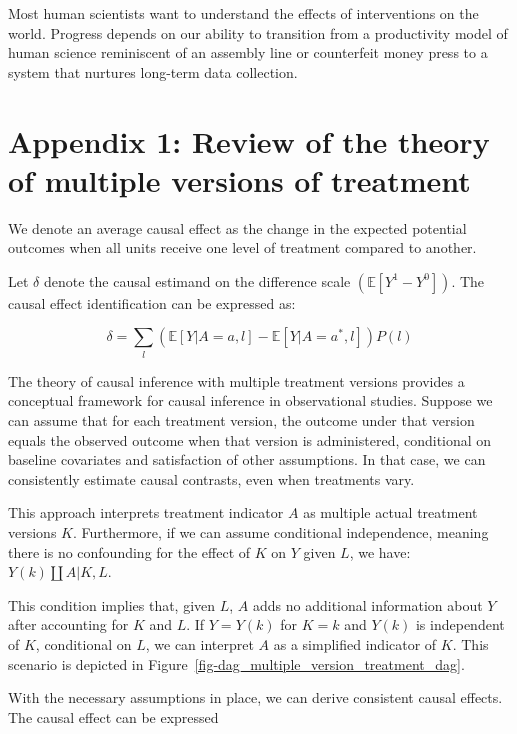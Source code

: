 \documentclass[
  singlecolumn]{report}
\begin{document}
Most human scientists want to understand the effects of interventions on
the world. Progress depends on our ability to transition from a
productivity model of human science reminiscent of an assembly line or
counterfeit money press to a system that nurtures long-term data
collection.

\newpage{}

\hypertarget{appendix-1-review-of-the-theory-of-multiple-versions-of-treatment}{%
\section{Appendix 1: Review of the theory of multiple versions of
treatment}\label{appendix-1-review-of-the-theory-of-multiple-versions-of-treatment}}

We denote an average causal effect as the change in the expected
potential outcomes when all units receive one level of treatment
compared to another.

Let \(\delta\) denote the causal estimand on the difference scale
\((\mathbb{E}[Y^1 - Y^0])\). The causal effect identification can be
expressed as:

\[ \delta = \sum_l \left( \mathbb{E}[Y|A=a,l] - \mathbb{E}[Y|A=a^*,l] \right) P(l)\]

The theory of causal inference with multiple treatment versions provides
a conceptual framework for causal inference in observational studies.
Suppose we can assume that for each treatment version, the outcome under
that version equals the observed outcome when that version is
administered, conditional on baseline covariates and satisfaction of
other assumptions. In that case, we can consistently estimate causal
contrasts, even when treatments vary.

This approach interprets treatment indicator \(A\) as multiple actual
treatment versions \(K\). Furthermore, if we can assume conditional
independence, meaning there is no confounding for the effect of \(K\) on
\(Y\) given \(L\), we have: \(Y(k)\coprod A|K,L\).

This condition implies that, given \(L\), \(A\) adds no additional
information about \(Y\) after accounting for \(K\) and \(L\). If
\(Y = Y(k)\) for \(K = k\) and \(Y(k)\) is independent of \(K\),
conditional on \(L\), we can interpret \(A\) as a simplified indicator
of \(K\). This scenario is depicted in
Figure~\ref{fig-dag_multiple_version_treatment_dag}.

With the necessary assumptions in place, we can derive consistent causal
effects. The causal effect can be expressed
\end{document}
